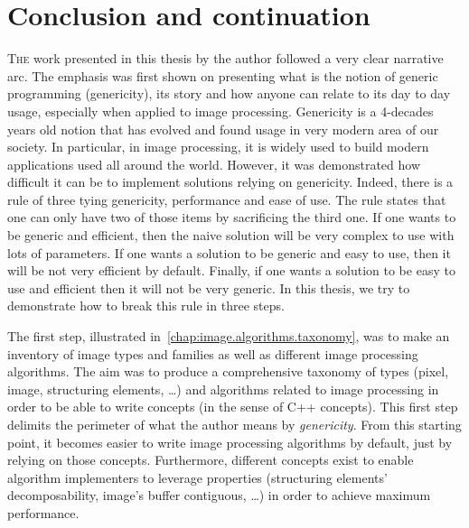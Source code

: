 \chapter{Conclusion and continuation}
\label{chap:conclusion}

\lettrine[lines=2]{T}{he} work presented in this thesis by the author followed a very clear narrative arc. The emphasis
was first shown on presenting what is the notion of generic programming (genericity), its story and how anyone can
relate to its day to day usage, especially when applied to image processing. Genericity is a 4-decades years old notion
that has evolved and found usage in very modern area of our society. In particular, in image processing, it is widely
used to build modern applications used all around the world. However, it was demonstrated how difficult it can be to
implement solutions relying on genericity. Indeed, there is a rule of three tying genericity, performance and ease of
use. The rule states that one can only have two of those items by sacrificing the third one. If one wants to be generic
and efficient, then the naive solution will be very complex to use with lots of parameters. If one wants a solution to
be generic and easy to use, then it will be not very efficient by default. Finally, if one wants a solution to be easy
to use and efficient then it will not be very generic. In this thesis, we try to demonstrate how to break this rule in
three steps.

The first step, illustrated in~\cref{chap:image.algorithms.taxonomy}, was to make an inventory of image types and
families as well as different image processing algorithms. The aim was to produce a comprehensive taxonomy of types
(pixel, image, structuring elements, \ldots) and algorithms related to image processing in order to be able to write
concepts (in the sense of C++ concepts). This first step delimits the perimeter of what the author means by
\emph{genericity}. From this starting point, it becomes easier to write image processing algorithms by default, just by
relying on those concepts. Furthermore, different concepts exist to enable algorithm implementers to leverage properties
(structuring elements' decomposability, image's buffer contiguous, \ldots) in order to achieve maximum performance.

